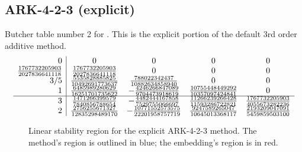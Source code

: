 \documentclass[letterpaper,10pt,english]{sphinxmanual}
\begin{document}
\subsection{ARK-4-2-3 (explicit)}
\label{Butcher:butcher-ark-4-2-3-e}\label{Butcher:ark-4-2-3-explicit}
Butcher table number 2
for {\hyperref[c_interface/User_callable:c.ARKodeSetERKTableNum]{\emph{}}}.  This is
the explicit portion of the default 3rd order additive method.
\begin{gather}
\begin{split}\begin{array}{r|cccc}
  0 & 0 & 0 & 0 & 0 \\
  \frac{1767732205903}{2027836641118} & \frac{1767732205903}{2027836641118} & 0 & 0 & 0 \\
  3/5 & \frac{5535828885825}{10492691773637} & \frac{788022342437}{10882634858940} & 0 & 0 \\
  1 & \frac{6485989280629}{16251701735622} & -\frac{4246266847089}{9704473918619} & \frac{10755448449292}{10357097424841} & 0 \\
  \hline
  3 & \frac{1471266399579}{7840856788654} & -\frac{4482444167858}{7529755066697} & \frac{11266239266428}{11593286722821} & \frac{1767732205903}{4055673282236} \\
  2 & \frac{2756255671327}{12835298489170} & -\frac{10771552573575}{22201958757719} & \frac{9247589265047}{10645013368117} & \frac{2193209047091}{5459859503100}
\end{array}\end{split}\notag
\end{gather}\begin{figure}[htbp]
\centering
\capstart

\caption{Linear stability region for the explicit ARK-4-2-3 method.  The method's
region is outlined in blue; the embedding's region is in red.}\end{figure}
\end{document}
